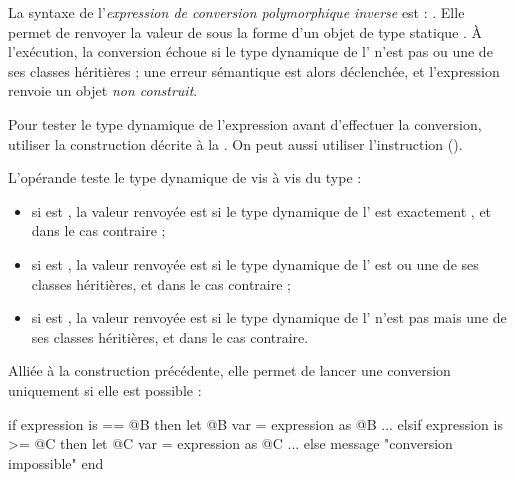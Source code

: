 La syntaxe de l'\emph{expression de conversion polymorphique inverse} est : . Elle permet de renvoyer la valeur de  sous la forme d'un objet de type statique . À l'exécution, la conversion échoue si le type dynamique de l' n'est pas  ou une de ses classes héritières ; une erreur sémantique est alors déclenchée, et l'expression renvoie un objet \emph{non construit}.

Pour tester le type dynamique de l'expression avant d'effectuer la conversion, utiliser la construction décrite à la . On peut aussi utiliser l'instruction  ().








L'opérande  teste le type dynamique de  vis à vis du type  :
\begin{itemize}
\item si  est \galgas{==}, la valeur renvoyée est  si le type dynamique de l' est exactement , et  dans le cas contraire ;
\item si  est \galgas{>=}, la valeur renvoyée est  si le type dynamique de l' est  ou une de ses classes héritières, et  dans le cas contraire ;
\item si  est \galgas{>}, la valeur renvoyée est  si le type dynamique de l' n'est pas  mais une de ses classes héritières, et  dans le cas contraire.
\end{itemize}



Alliée à la construction précédente, elle permet de lancer une conversion uniquement si elle est possible :

\begin{galgascode}
if expression is == @B then
  let @B var = expression as @B
  ...
elsif expression is >= @C then
  let @C var = expression as @C
  ...
else
  message "conversion impossible"
end
\end{galgascode}





